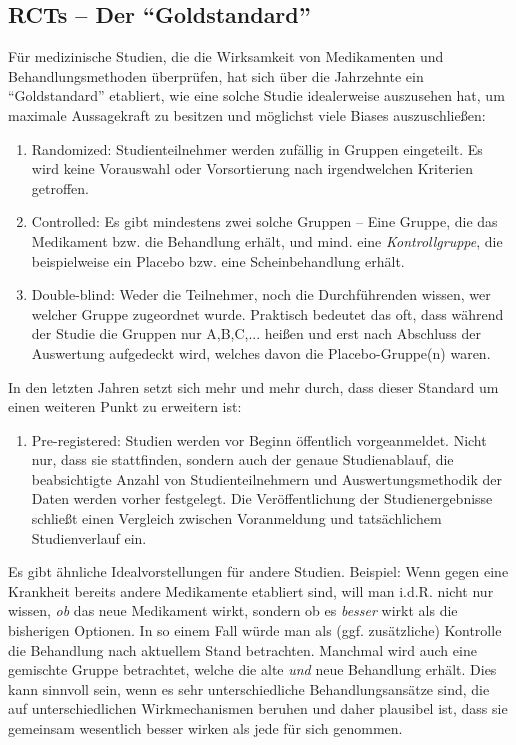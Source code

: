 \subsection{RCTs -- Der \enquote{Goldstandard}}

Für medizinische Studien, die die Wirksamkeit von Medikamenten und Behandlungsmethoden überprüfen, hat sich über die Jahrzehnte ein \enquote{Goldstandard} etabliert, wie eine solche Studie idealerweise auszusehen hat, um maximale Aussagekraft zu besitzen und möglichst viele Biases auszuschließen:
\begin{enumerate}
\item Randomized: Studienteilnehmer werden zufällig in Gruppen eingeteilt. Es wird keine Vorauswahl oder Vorsortierung nach irgendwelchen Kriterien getroffen.
\item Controlled: Es gibt mindestens zwei solche Gruppen -- Eine Gruppe, die das Medikament bzw. die Behandlung erhält, und mind. eine \emph{Kontrollgruppe}, die beispielweise ein Placebo bzw. eine Scheinbehandlung erhält.
\item Double-blind: Weder die Teilnehmer, noch die Durchführenden wissen, wer welcher Gruppe zugeordnet wurde. Praktisch bedeutet das oft, dass während der Studie die Gruppen nur A,B,C,... heißen und erst nach Abschluss der Auswertung aufgedeckt wird, welches davon die Placebo-Gruppe(n) waren.
\end{enumerate}
In den letzten Jahren setzt sich mehr und mehr durch, dass dieser Standard um einen weiteren Punkt zu erweitern ist:
\begin{enumerate}[resume]
\item Pre-registered: Studien werden vor Beginn öffentlich vorgeanmeldet. Nicht nur, dass sie stattfinden, sondern auch der genaue Studienablauf, die beabsichtigte Anzahl von Studienteilnehmern und Auswertungsmethodik der Daten werden vorher festgelegt. Die Veröffentlichung der Studienergebnisse schließt einen Vergleich zwischen Voranmeldung und tatsächlichem Studienverlauf ein.
\end{enumerate}

Es gibt ähnliche Idealvorstellungen für andere Studien. Beispiel: Wenn gegen eine Krankheit bereits andere Medikamente etabliert sind, will man i.d.R. nicht nur wissen, \emph{ob} das neue Medikament wirkt, sondern ob es \emph{besser} wirkt als die bisherigen Optionen. In so einem Fall würde man als (ggf. zusätzliche) Kontrolle die Behandlung nach aktuellem Stand betrachten. Manchmal wird auch eine gemischte Gruppe betrachtet, welche die alte \emph{und} neue Behandlung erhält. Dies kann sinnvoll sein, wenn es sehr unterschiedliche Behandlungsansätze sind, die auf unterschiedlichen Wirkmechanismen beruhen und daher plausibel ist, dass sie gemeinsam wesentlich besser wirken als jede für sich genommen.

